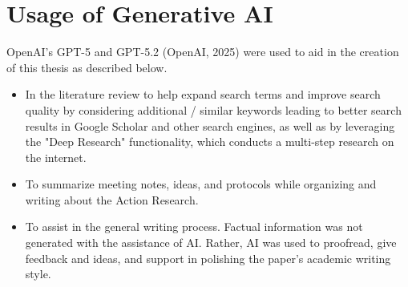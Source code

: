 \chapter*{Usage of Generative AI}
\thispagestyle{empty}
OpenAI's GPT-5 and GPT-5.2 (OpenAI, 2025) \cite{openai_chatgpt_2023} were used to aid in the creation of this thesis as described below.

\begin{itemize}
	\item In the literature review to help expand search terms and improve search quality by considering additional / similar keywords leading to better search results in Google Scholar and other search engines, as well as by leveraging the "Deep Research" functionality, which conducts a multi-step research on the internet.
	\item To summarize meeting notes, ideas, and protocols while organizing and writing about the Action Research.
 	\item To assist in the general writing process. Factual information was not generated with the assistance of AI. Rather, AI was used to proofread, give feedback and ideas, and support in polishing the paper's academic writing style.
\end{itemize}